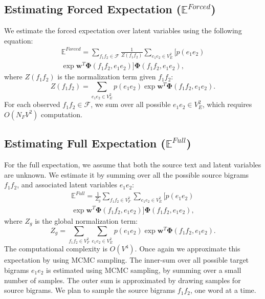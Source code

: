\subsection{Estimating Forced Expectation ($\mathbb{E}^{Forced} $)}
We estimate the forced expectation over latent variables using the following equation:
\begin{multline}
\mathbb{E}^{Forced} =  \sum_{f_1f_2 \in \mathcal{F}} \frac{1}{Z(f_1f_2)}  \sum_{e_1e_2 \in V_E^2}  \biggl [ p(e_1 e_2)\\  \exp{\mathbf{w}^T\mathbf{\Phi}(f_1f_2, e_1e_2)} \biggr ] \mathbf{\Phi}(f_1 f_2, e_1 e_2),
\end{multline}
where $Z(f_1f_2)$ is the normalization term given $f_1 f_2$: 
\begin{equation*}
Z(f_1f_2) = \sum_{e_1e_2 \in V_E^2} p(e_1 e_2)  \exp{\mathbf{w}^T\mathbf{\Phi}(f_1f_2, e_1e_2)}.
\end{equation*}
\normalsize
For each observed $f_1 f_2 \in \mathcal{F}$, we sum over all possible $e_1 e_2 \in V_E^2$, which requires $O(N_F V^2 )$ computation. 
\subsection{Estimating Full Expectation ($\mathbb{E}^{Full} $)}
For the full expectation, we assume that both the source text and latent variables are unknown.
We estimate it by summing over all the possible source bigrams $f_1f_2$, and associated latent variables $e_1e_2$:
\begin{multline}
\mathbb{E}^{Full} =  \frac{1}{Z_g}   \sum_{f_1 f_2 \in V_F^2} \sum_{e_1 e_2 \in V_E^2}  \biggl [ p(e_1 e_2) \\ \exp{\mathbf{w}^T\mathbf{\Phi}(f_1f_2, e_1e_2)} \biggr ] \mathbf{\Phi}(f_1 f_2, e_1 e_2),
\end{multline}
where $Z_g$ is the global normalization term:
{\small
\begin{equation*}
Z_g = \sum_{f_1 f_2 \in V_F^2} \sum_{e_1e_2 \in V_E^2} p(e_1 e_2)  \exp{\mathbf{w}^T\mathbf{\Phi}(f_1f_2, e_1e_2)}.
\end{equation*}
}
\normalsize
The computational complexity is $O(V^4)$.
Once again we approximate this expectation by using MCMC sampling. The inner-sum over all possible target bigrams $e_1 e_2$ is estimated using MCMC sampling, by summing over a small number of samples. 
The outer sum is approximated by drawing samples for source bigrams. 
We plan to sample the source bigrams $f_1 f_2$, one word at a time. 
